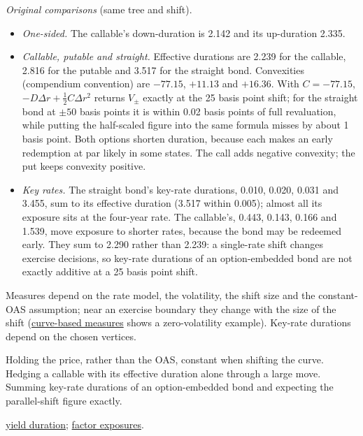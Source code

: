 \begin{qfmethod}
\emph{Original comparisons} (same tree and shift).
\begin{itemize}
\item \emph{One-sided.} The callable's down-duration is 2.142 and its up-duration 2.335.
\item \emph{Callable, putable and straight.} Effective durations are 2.239 for the callable, 2.816 for the putable and 3.517 for the straight bond. Convexities (compendium convention) are $-77.15$, $+11.13$ and $+16.36$. With $C=-77.15$, $-D\Delta r+\tfrac12C\Delta r^2$ returns $V_\pm$ exactly at the 25 basis point shift; for the straight bond at $\pm50$ basis points it is within 0.02 basis points of full revaluation, while putting the half-scaled figure into the same formula misses by about 1 basis point. Both options shorten duration, because each makes an early redemption at par likely in some states. The call adds negative convexity; the put keeps convexity positive.
\item \emph{Key rates.} The straight bond's key-rate durations, 0.010, 0.020, 0.031 and 3.455, sum to its effective duration (3.517 within 0.005); almost all its exposure sits at the four-year rate. The callable's, 0.443, 0.143, 0.166 and 1.539, move exposure to shorter rates, because the bond may be redeemed early. They sum to 2.290 rather than 2.239: a single-rate shift changes exercise decisions, so key-rate durations of an option-embedded bond are not exactly additive at a 25 basis point shift.
\end{itemize}

 Measures depend on the rate model, the volatility, the shift size and the constant-OAS assumption; near an exercise boundary they change with the size of the shift (\hyperref[meth:curve-based-empirical-duration]{curve-based measures} shows a zero-volatility example). Key-rate durations depend on the chosen vertices.

 Holding the price, rather than the OAS, constant when shifting the curve. Hedging a callable with its effective duration alone through a large move. Summing key-rate durations of an option-embedded bond and expecting the parallel-shift figure exactly.

 \hyperref[meth:yield-duration-pvbp]{yield duration}; \hyperref[meth:yield-curve-factor-exposures]{factor exposures}.

\end{qfmethod}

